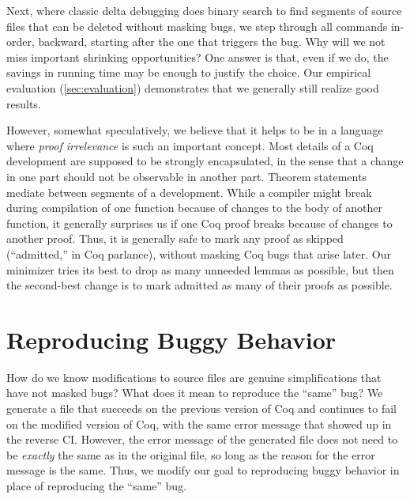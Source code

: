 \documentclass[a4paper,USenglish,cleveref,autoref,thm-restate]{lipics-v2021}
\begin{document}
Next, where classic delta debugging does binary search to find segments of source files that can be deleted without masking bugs, we step through all commands in-order, backward, starting after the one that triggers the bug.
Why will we not miss important shrinking opportunities?
One answer is that, even if we do, the savings in running time may be enough to justify the choice.
Our empirical evaluation (\autoref{sec:evaluation}) demonstrates that we generally still realize good results.

However, somewhat speculatively, we believe that it helps to be in a language where \emph{proof irrelevance} is such an important concept.
Most details of a Coq development are supposed to be strongly encapsulated, in the sense that a change in one part should not be observable in another part.
Theorem statements mediate between segments of a development.
While a compiler might break during compilation of one function because of changes to the body of another function, it generally surprises us if one Coq proof breaks because of changes to another proof.
Thus, it is generally safe to mark any proof as skipped (``admitted,'' in Coq parlance), without masking Coq bugs that arise later.
Our minimizer tries its best to drop as many unneeded lemmas as possible, but then the second-best change is to mark admitted as many of their proofs as possible.


\section{Reproducing Buggy Behavior}\label{sec:error-messages}

How do we know modifications to source files are genuine simplifications that have not masked bugs?
What does it mean to reproduce the ``same'' bug?
We generate a file that succeeds on the previous version of Coq and continues to fail on the modified version of Coq, with the same error message that showed up in the reverse CI.
However, the error message of the generated file does not need to be \emph{exactly} the same as in the original file, so long as the reason for the error message is the same.
Thus, we modify our goal to reproducing buggy behavior in place of reproducing the ``same'' bug.
\end{document}

